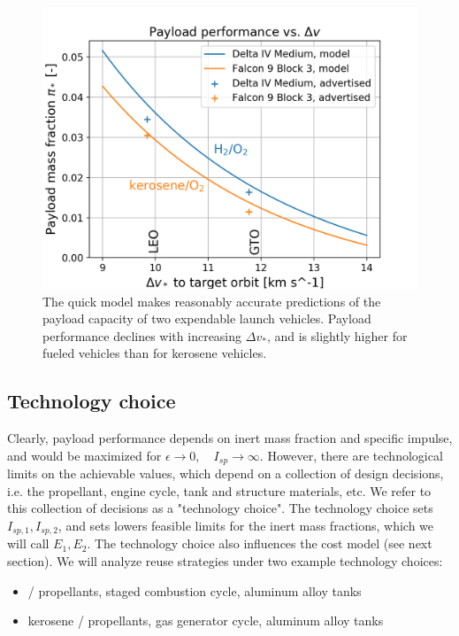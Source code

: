\documentclass[conf]{new-aiaa}
\begin{document}
\begin{figure}[hbt!]
    \centering
    \includegraphics[width=\textwidth]{../../lvreuse/analysis/performance/plots/payload_vs_dv}
    \caption{\label{fig:payload_vs_dv} The quick model makes reasonably accurate predictions of the payload capacity of two expendable launch vehicles. Payload performance declines with increasing $\Delta v_*$, and is slightly higher for  fueled vehicles than for kerosene vehicles.}
\end{figure}

\subsection{Technology choice}
Clearly, payload performance depends on inert mass fraction and specific impulse, and would be maximized for $\epsilon \rightarrow 0, \quad I_{sp} \rightarrow \infty$. However, there are technological limits on the achievable values, which depend on a collection of design decisions, i.e. the propellant, engine cycle, tank and structure materials, etc. We refer to this collection of decisions as a "technology choice". The technology choice sets $I_{sp, 1}, I_{sp, 2}$, and sets lowers feasible limits for the inert mass fractions, which we will call $E_1, E_2$. The technology choice also influences the cost model (see next section). We will analyze reuse strategies under two example technology choices:

\begin{itemize}
    \item {} /  propellants, staged combustion cycle, aluminum alloy tanks
    \item kerosene /  propellants, gas generator cycle, aluminum alloy tanks
\end{itemize}
\end{document}
